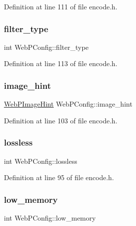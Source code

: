 Definition at line 111 of file encode.\+h.

\mbox{\label{struct_web_p_config_ad6e0e58a9de23dd49a743a8ca95a9562}} 
\subsubsection{\texorpdfstring{filter\_type}{filter\_type}}
{\footnotesize\ttfamily int Web\+P\+Config\+::filter\+\_\+type}



Definition at line 113 of file encode.\+h.

\mbox{\label{struct_web_p_config_ae55295c3b9a0dc313cd7eb6c35b613cc}} 
\subsubsection{\texorpdfstring{image\_hint}{image\_hint}}
{\footnotesize\ttfamily \mbox{\hyperlink{encode_8h_a1f68d574ed8013982452c9bceab8bab8}{Web\+P\+Image\+Hint}} Web\+P\+Config\+::image\+\_\+hint}



Definition at line 103 of file encode.\+h.

\mbox{\label{struct_web_p_config_ae76342aafc7e4e4faae98c8b40b4c426}} 
\subsubsection{\texorpdfstring{lossless}{lossless}}
{\footnotesize\ttfamily int Web\+P\+Config\+::lossless}



Definition at line 95 of file encode.\+h.

\mbox{\label{struct_web_p_config_a20c29885747e7b6a7dcbaabcad695449}} 
\subsubsection{\texorpdfstring{low\_memory}{low\_memory}}
{\footnotesize\ttfamily int Web\+P\+Config\+::low\+\_\+memory}



